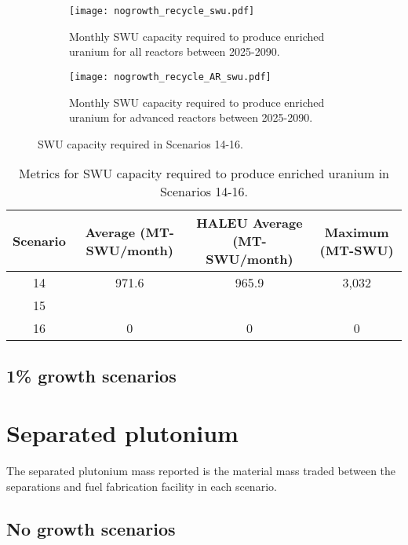 \begin{figure}[h!]
    \centering
    \begin{subfigure}[b]{0.45\textwidth}
        \centering
        \texttt{[image: nogrowth\_recycle\_swu.pdf]}
        \caption{Monthly SWU capacity required to produce 
        enriched uranium for all reactors between 2025-2090.}
        \label{fig:nogrowth_recycle_swu_all}
    \end{subfigure}
    \hfill
    \begin{subfigure}[b]{0.45\textwidth}
        \centering
        \texttt{[image: nogrowth\_recycle\_AR\_swu.pdf]}
        \caption{Monthly SWU capacity required to produce 
        enriched uranium for advanced reactors between 2025-2090.}
        \label{fig:nogrowth_recycle_swu_AR}
    \end{subfigure}
       \caption{\gls{SWU} capacity required in Scenarios 14-16.}
       \label{fig:nogrowth_recycle_swu}
\end{figure}

\begin{table}[h!]
    \centering 
    \caption{Metrics for \gls{SWU} capacity required to produce 
    enriched uranium in Scenarios 14-16.}
    \label{tab:s14-16_swu}
    \begin{tabular}{c c c c}
        \hline 
        Scenario & Average (MT-SWU/month) & HALEU Average (MT-SWU/month)
         & Maximum (MT-SWU) \\
        \hline 
        14 & 971.6 & 965.9 & 3,032 \\
        15 & & &  \\
        16 & 0 & 0 & 0 \\
        \hline
        
    \end{tabular}
\end{table}

\subsection{1\% growth scenarios}

\section{Separated plutonium}
The separated plutonium mass reported is the material mass traded 
between the separations and fuel fabrication facility in each 
scenario. 

\subsection{No growth scenarios}

